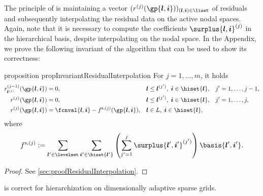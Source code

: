 The principle of  is maintaining
a vector $(r^{(j)}(\gp{\*l,\*i}))_{(\*l,\*i) \in \liset}$ of residuals
and subsequently interpolating the residual data on the active nodal spaces.
Again, note that it is necessary to compute the coefficients
$\surplus{\*l,\*i}^{(j)}$ in the hierarchical basis, despite interpolating
on the nodal space.
In the Appendix, we prove the following invariant of the algorithm that
can be used to show its correctness:

\begin{restatable}{%
  proposition%
}{%
  propInvariantResidualInterpolation%
}
  \label{prop:invariantResidualInterpolation}
  For $j = 1, \dotsc, m$, it holds
  \begin{subequations}
    \label{eq:propInvariantResidualInterpolationStatements}
    \begin{align}
      \label{eq:propInvariantResidualInterpolation1}
      r_{\*l^{(j)}}^{(j-1)}(\gp{\*l,\*i})
      &= 0,
      &&\*l \le \*l^{(j')},\; \*i \in \hiset{\*l},
      &j'
      &= 1, \dotsc, j - 1,\\
      \label{eq:propInvariantResidualInterpolation2}
      r^{(j)}(\gp{\*l,\*i})
      &= 0,
      &&\*l \le \*l^{(j')},\; \*i \in \hiset{\*l},
      &j'
      &= 1, \dotsc, j,\\
      \label{eq:propInvariantResidualInterpolation3}
      r^{(j)}(\gp{\*l,\*i})
      &= \fcnval{\*l,\*i} - f^{\sparse,(j)}(\gp{\*l,\*i}),
      &&\*l \in L,\; \*i \in \hiset{\*l},&&
    \end{align}
  \end{subequations}
  where
  \begin{equation}
    \label{eq:propInvariantResidualInterpolation4}
    f^{\sparse,(j)}
    := \sum_{\*l' \in \levelset} \sum_{\*i' \in \hiset{\*l'}}
    \left(\sum_{j'=1}^{j} \surplus{\*l',\*i'}^{(j')}\right) \basis{\*l',\*i'}.
  \end{equation}
\end{restatable}

\begin{proof}
  See \cref{sec:proofResidualInterpolation}.
\end{proof}

\begin{corollary}
   is correct for hierarchization
  on dimensionally adaptive sparse grids.
\end{corollary}

